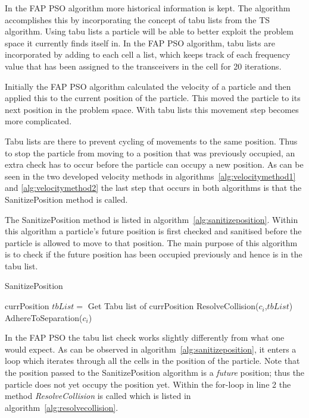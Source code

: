 In the \gls{FAP} \gls{PSO} algorithm more historical information is kept. The algorithm accomplishes this by incorporating the concept of tabu lists from the \gls{TS} algorithm. Using tabu lists a particle will be able to better exploit the problem space it currently finds itself in. In the \gls{FAP} \gls{PSO} algorithm, tabu lists are incorporated by adding to each cell a list, which keeps track of each frequency value that has been assigned to the transceivers in the cell for 20 iterations.

Initially the \gls{FAP} \gls{PSO} algorithm calculated the velocity of a particle and then applied this to the current position of the particle. This moved the particle to its next position in the problem space. With tabu lists this movement step becomes more complicated.

Tabu lists are there to prevent cycling of movements to the same position. Thus to stop the particle from moving to a position that was previously occupied, an extra check has to occur before the particle can occupy a new position. As can be seen in the two developed velocity methods in algorithms~\ref{alg:velocitymethod1} and \ref{alg:velocitymethod2} the last step that occurs in both algorithms is that the SanitizePosition method is called.


The SanitizePosition method is listed in algorithm~\ref{alg:sanitizeposition}. Within this algorithm a particle's future position is first checked and sanitised before the particle is allowed to move to that position. The main purpose of this algorithm is to check if the future position has been occupied previously and hence is in the tabu list. 
\begin{algorithm}[H]
\caption{SanitizePosition}
\label{alg:sanitizeposition}
\begin{algorithmic}[1]
	\Require currPosition
		\State $tbList = $ Get Tabu list of currPosition
		\State ResolveCollision($c_i$,$tbList$)
		\State AdhereToSeparation($c_i$)
	\EndFor
\end{algorithmic}
\end{algorithm}


In the \gls{FAP} \gls{PSO} the tabu list check works slightly differently from what one would expect. As can be observed in algorithm~\ref{alg:sanitizeposition}, it enters a loop which iterates through all the cells in the position of the particle. Note that the position passed to the SanitizePosition algorithm is a \emph{future} position; thus the particle does not yet occupy the position yet. Within the for-loop in line 2 the method \emph{ResolveCollision} is called which is listed in algorithm~\ref{alg:resolvecollision}.

